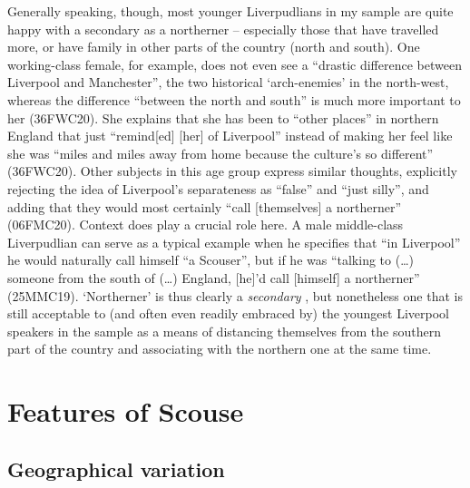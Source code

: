 Generally speaking, though, most younger Liverpudlians in my sample are quite happy with a secondary  as a northerner -- especially those that have travelled more, or have family in other parts of the country (north and south).
One working-class female, for example, does not even see a ``drastic difference between Liverpool and Manchester'', the two historical `arch-enemies' in the north-west, whereas the difference ``between the north and south'' is much more important to her (36FWC20).
She explains that she has been to ``other places'' in northern England that just ``remind[ed] [her] of Liverpool'' instead of making her feel like she was ``miles and miles away from home because the culture's so different'' (36FWC20).
Other subjects in this age group express similar thoughts, explicitly rejecting the idea of Liverpool's separateness as ``false'' and ``just silly'', and adding that they would most certainly ``call [themselves] a northerner'' (06FMC20).
Context does play a crucial role here.
A male middle-class Liverpudlian can serve as a typical example when he specifies that ``in Liverpool'' he would naturally call himself ``a Scouser'', but if he was ``talking to (\ldots) someone from the south of (\ldots) England, [he]'d call [himself] a northerner'' (25MMC19).
`Northerner' is thus clearly a \emph{secondary} , but nonetheless one that is still acceptable to (and often even readily embraced by) the youngest Liverpool speakers in the sample as a means of distancing themselves from the southern part of the country and associating with the northern one at the same time.

\section{Features of Scouse}

\subsection{Geographical variation}

